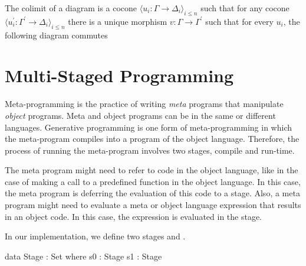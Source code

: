 The colimit of a diagram is a cocone  
$\langle u_i : \Gamma \to \Delta_i \rangle_{i\leq n}$ such that for any cocone 
$\langle u_i^{\prime} : \Gamma^{\prime} \to \Delta_i \rangle_{i\leq n}$ there is a unique morphism $v : \Gamma \to \Gamma^\prime$ such that for every $u_i$, the following diagram commutes 

\section{Multi-Staged Programming}
\label{sec:background:msp}
Meta-programming is the practice of writing \emph{meta} programs that manipulate \emph{object} programs. Meta and object programs can be in the same or different languages. Generative programming is one form of meta-programming in which the meta-program compiles into a program of the object language. Therefore, the process of running the meta-program involves two stages, compile and run-time. 

The meta program might need to refer to code in the object language, like in the case of making a call to a predefined function in the object language. In this case, the meta program is deferring the evaluation of this code to a  stage. 
Also, a meta program might need to evaluate a meta or object language expression that results in an object code. In this case, the expression is evaluated in the  stage. 

In our implementation, we define two stages  and . 
\begin{togcode}
data Stage : Set where
  s0 : Stage
  s1 : Stage
\end{togcode} 

